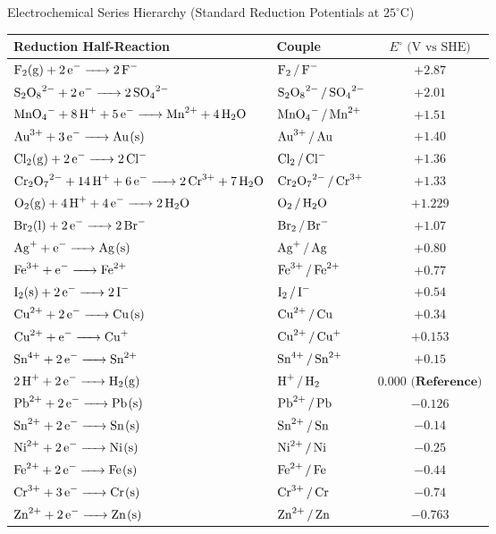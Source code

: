 \documentclass[11pt,a4paper]{report}
\begin{document}
\begin{databox}{Electrochemical Series Hierarchy (Standard Reduction Potentials at $25^\circ\text{C}$)}
\centering
\begin{tabular}{llc}
\toprule
\textbf{Reduction Half-Reaction} & \textbf{Couple} & $E^\circ\text{ (V vs SHE)}$ \\
\midrule
$\ce{F2(g) + 2e^- -> 2F^-}$ & $\ce{F2 / F^-}$ & $+2.87$ \\
$\ce{S2O8^{2-} + 2e^- -> 2SO4^{2-}}$ & $\ce{S2O8^{2-} / SO4^{2-}}$ & $+2.01$ \\
$\ce{MnO4^- + 8H^+ + 5e^- -> Mn^{2+} + 4H2O}$ & $\ce{MnO4^- / Mn^{2+}}$ & $+1.51$ \\
$\ce{Au^{3+} + 3e^- -> Au(s)}$ & $\ce{Au^{3+} / Au}$ & $+1.40$ \\
$\ce{Cl2(g) + 2e^- -> 2Cl^-}$ & $\ce{Cl2 / Cl^-}$ & $+1.36$ \\
$\ce{Cr2O7^{2-} + 14H^+ + 6e^- -> 2Cr^{3+} + 7H2O}$ & $\ce{Cr2O7^{2-} / Cr^{3+}}$ & $+1.33$ \\
$\ce{O2(g) + 4H^+ + 4e^- -> 2H2O}$ & $\ce{O2 / H2O}$ & $+1.229$ \\
$\ce{Br2(l) + 2e^- -> 2Br^-}$ & $\ce{Br2 / Br^-}$ & $+1.07$ \\
$\ce{Ag^+ + e^- -> Ag(s)}$ & $\ce{Ag^+ / Ag}$ & $+0.80$ \\
$\ce{Fe^{3+} + e^- -> Fe^{2+}}$ & $\ce{Fe^{3+} / Fe^{2+}}$ & $+0.77$ \\
$\ce{I2(s) + 2e^- -> 2I^-}$ & $\ce{I2 / I^-}$ & $+0.54$ \\
$\ce{Cu^{2+} + 2e^- -> Cu(s)}$ & $\ce{Cu^{2+} / Cu}$ & $+0.34$ \\
$\ce{Cu^{2+} + e^- -> Cu^+}$ & $\ce{Cu^{2+} / Cu^+}$ & $+0.153$ \\
$\ce{Sn^{4+} + 2e^- -> Sn^{2+}}$ & $\ce{Sn^{4+} / Sn^{2+}}$ & $+0.15$ \\
$\ce{2H^+ + 2e^- -> H2(g)}$ & $\ce{H^+ / H2}$ & $\bm{0.000\text{ (Reference)}}$ \\
$\ce{Pb^{2+} + 2e^- -> Pb(s)}$ & $\ce{Pb^{2+} / Pb}$ & $-0.126$ \\
$\ce{Sn^{2+} + 2e^- -> Sn(s)}$ & $\ce{Sn^{2+} / Sn}$ & $-0.14$ \\
$\ce{Ni^{2+} + 2e^- -> Ni(s)}$ & $\ce{Ni^{2+} / Ni}$ & $-0.25$ \\
$\ce{Fe^{2+} + 2e^- -> Fe(s)}$ & $\ce{Fe^{2+} / Fe}$ & $-0.44$ \\
$\ce{Cr^{3+} + 3e^- -> Cr(s)}$ & $\ce{Cr^{3+} / Cr}$ & $-0.74$ \\
$\ce{Zn^{2+} + 2e^- -> Zn(s)}$ & $\ce{Zn^{2+} / Zn}$ & $-0.763$ \\

\end{tabular}
\end{databox}
\end{document}
